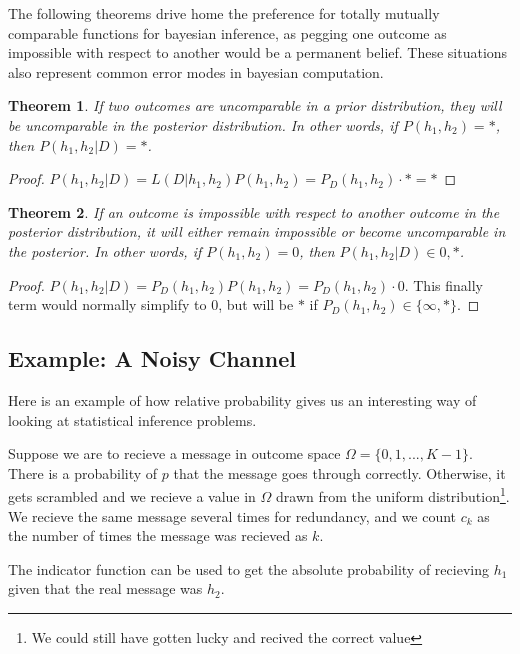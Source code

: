 \documentclass[twoside]{article}
\theoremstyle{plain}%
\newtheorem{theorem}{Theorem}[section]
\theoremstyle{definition}
\theoremstyle{remark}
\begin{document}
The following theorems drive home the preference for totally mutually comparable functions for bayesian inference, as pegging one outcome as impossible with respect to another would be a permanent belief. These situations also represent common error modes in bayesian computation.

\begin{theorem}
If two outcomes are uncomparable in a prior distribution, they will be uncomparable in the posterior distribution. In other words, if \(P(h_1, h_2)=\ast\), then \(P(h_1, h_2|D) = \ast\).
\end{theorem}

\begin{proof}
\(P(h_1, h_2|D) = L(D|h_1, h_2) P(h_1, h_2) = P_D(h_1, h_2) \cdot \ast = \ast\)
\end{proof}

\begin{theorem}
If an outcome is impossible with respect to another outcome in the posterior distribution, it will either remain impossible or become uncomparable in the posterior. In other words,  if \(P(h_1, h_2)=0\), then \(P(h_1, h_2|D) \in {0, \ast}\).
\end{theorem}

\begin{proof}
\(P(h_1, h_2|D) = P_D(h_1, h_2) P(h_1, h_2) = P_D(h_1, h_2) \cdot 0\). This finally term would normally simplify to 0, but will be \(\ast\) if \(P_D(h_1, h_2) \in \{\infty, \ast\}\).
\end{proof}

\subsection{Example: A Noisy Channel}

Here is an example of how relative probability gives us an interesting way of looking at statistical inference problems.

Suppose we are to recieve a message in outcome space \(\Omega = \{0, 1, ..., K-1\}\). There is a probability of \(p\) that the message goes through correctly. Otherwise, it gets scrambled and we recieve a value in \(\Omega\) drawn from the uniform distribution\footnote{We could still have gotten lucky and recived the correct value}. We recieve the same message several times for redundancy, and we count \(c_k\) as the number of times the message was recieved as \(k\).

The indicator function can be used to get the absolute probability of recieving \(h_1\) given that the real message was \(h_2\).
\end{document}
